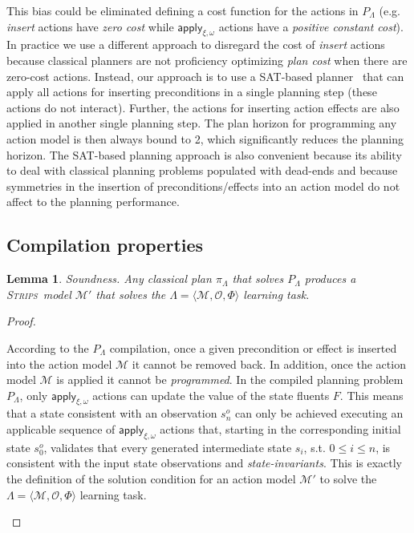 \documentclass{article}
\newcommand{\tup}[1]{{\langle #1 \rangle}}
\newcommand{\strips}{\textsc{Strips}}
\newtheorem{mylemma}[mytheorem]{Lemma}
\begin{document}
This bias could be eliminated defining a cost function for the actions in $P_\Lambda$ (e.g. {\em insert} actions have {\em zero cost} while $\mathsf{apply_{\xi,\omega}}$ actions have a {\em positive constant cost}). In practice we use a different approach to disregard the cost of {\em insert} actions because classical planners are not proficiency optimizing {\em plan cost} when there are zero-cost actions. Instead, our approach is to use a SAT-based planner~\cite{rintanen2014madagascar} that can apply all actions for inserting preconditions in a single planning step (these actions do not interact). Further, the actions for inserting action effects are also applied in another single planning step. The plan horizon for programming any action model is then always bound to 2, which significantly reduces the planning horizon. The SAT-based planning approach is also convenient because its ability to deal with classical planning problems populated with dead-ends and because symmetries in the insertion of preconditions/effects into an action model do not affect to the planning performance.

\subsection{Compilation properties}
\begin{mylemma}
Soundness. Any classical plan $\pi_{\Lambda}$ that solves $P_{\Lambda}$ produces a \strips\ model $\mathcal{M'}$ that solves the $\Lambda=\tup{\mathcal{M},{\mathcal O},\Phi}$ learning task.
\end{mylemma}

\begin{proof}[Proof]
\begin{small}
According to the $P_{\Lambda}$ compilation, once a given precondition or effect is inserted into the action model $\mathcal{M}$ it cannot be removed back. In addition, once the action model $\mathcal{M}$ is applied it cannot be {\em programmed}. In the compiled planning problem $P_{\Lambda}$, only $\mathsf{apply_{\xi,\omega}}$ actions can update the value of the state fluents $F$. This means that a state consistent with an observation $s_n^o$ can only be achieved executing an applicable sequence of $\mathsf{apply_{\xi,\omega}}$ actions that, starting in the corresponding initial state $s_0^o$, validates that every generated intermediate state $s_i$, s.t. $0\leq i\leq n$, is consistent with the input state observations and {\em state-invariants}. This is exactly the definition of the solution condition for an action model $\mathcal{M}'$ to solve the $\Lambda=\tup{\mathcal{M},{\mathcal O},\Phi}$ learning task.
\end{small}
\end{proof}
\end{document}

